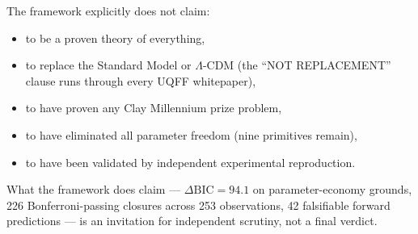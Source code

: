 The framework explicitly does not claim:

\begin{itemize}
  \item to be a proven theory of everything,
  \item to replace the Standard Model or $\Lambda$-CDM (the
        ``NOT REPLACEMENT'' clause runs through every UQFF
        whitepaper),
  \item to have proven any Clay Millennium prize problem,
  \item to have eliminated all parameter freedom (nine primitives
        remain),
  \item to have been validated by independent experimental
        reproduction.
\end{itemize}

What the framework does claim --- $\Delta\mathrm{BIC} = 94.1$ on
parameter-economy grounds, 226 Bonferroni-passing closures across
253 observations, 42 falsifiable forward predictions --- is an
invitation for independent scrutiny, not a final verdict.

